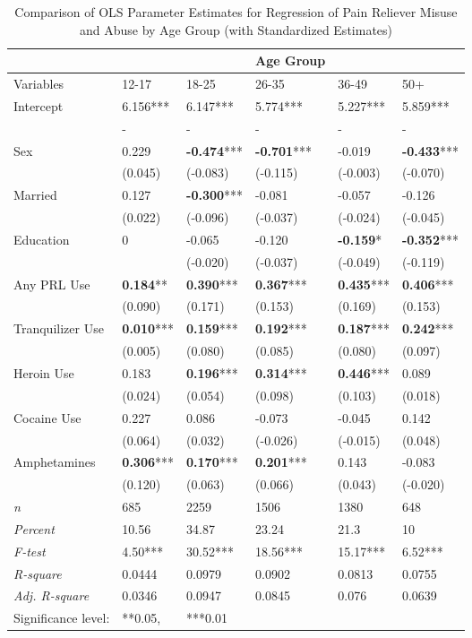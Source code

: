 \documentclass[sigconf]{acmart}
\begin{document}
\begin{table*}[ht]
  \caption{Comparison of OLS Parameter Estimates for Regression of Pain Reliever 
  Misuse and Abuse by Age Group (with Standardized Estimates)}
  \label{tab:freq}
  \begin{tabular}{llllll}
    \toprule
      & & & Age Group& &  \\
    \midrule
    Variables & 12-17& 18-25& 26-35& 36-49& 50+  \\
    \midrule
    Intercept& 6.156***& 6.147***& 5.774***& 5.227***& 5.859*** \\
           & -& -& -& -& - \\
    Sex& 0.229& \textbf{-0.474}***& \textbf{-0.701}***& -0.019& \textbf{-0.433}***  \\
           & (0.045)& (-0.083)& (-0.115)& (-0.003)& (-0.070) \\
    Married& 0.127& \textbf{-0.300}***& -0.081& -0.057& -0.126  \\
           & (0.022)& (-0.096)& (-0.037)& (-0.024)& (-0.045) \\
    Education& 0& -0.065& -0.120& \textbf{-0.159}*& \textbf{-0.352}*** \\
           &        & (-0.020)& (-0.037)& (-0.049)& (-0.119) \\
    Any PRL Use& \textbf{0.184}**& \textbf{0.390}***& \textbf{0.367}***& \textbf{0.435}***& \textbf{0.406}***  \\
           & (0.090)& (0.171)& (0.153)& (0.169)& (0.153) \\
    Tranquilizer Use& \textbf{0.010}***& \textbf{0.159}***& \textbf{0.192}***& \textbf{0.187}***& \textbf{0.242}*** \\
           & (0.005)& (0.080)& (0.085)& (0.080)& (0.097) \\
    Heroin Use& 0.183& \textbf{0.196}***& \textbf{0.314}***& \textbf{0.446}***& 0.089  \\
           & (0.024)& (0.054)& (0.098)& (0.103)& (0.018) \\
    Cocaine Use& 0.227& 0.086& -0.073& -0.045& 0.142  \\
           & (0.064)& (0.032)& (-0.026)& (-0.015)& (0.048) \\
    Amphetamines& \textbf{0.306}***& \textbf{0.170}***& \textbf{0.201}***& 0.143& -0.083  \\
           & (0.120)& (0.063)& (0.066)& (0.043)& (-0.020) \\
    \midrule
    \textit{n}       & 685& 2259& 1506&  1380& 648 \\
    \textit{Percent} & 10.56& 34.87& 23.24& 21.3& 10 \\ 
    \textit{F-test}  & 4.50*** & 30.52***& 18.56***& 15.17***& 6.52***  \\ 
    \textit{R-square}& 0.0444& 0.0979& 0.0902& 0.0813& 0.0755 \\ 
    \textit{Adj. R-square}& 0.0346 & 0.0947& 0.0845& 0.076& 0.0639 \\
    \bottomrule
    Significance level:&  **0.05,& ***0.01& &
  \end{tabular}
\end{table*}
\end{document}
